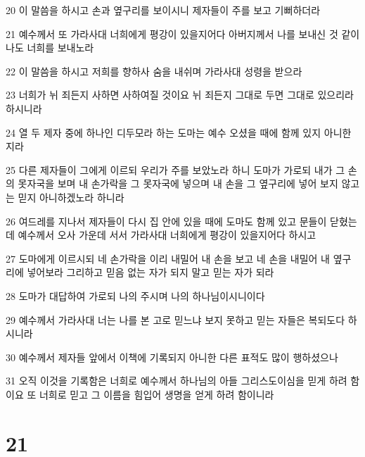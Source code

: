 \par 20 이 말씀을 하시고 손과 옆구리를 보이시니 제자들이 주를 보고 기뻐하더라
\par 21 예수께서 또 가라사대 너희에게 평강이 있을지어다 아버지께서 나를 보내신 것 같이 나도 너희를 보내노라
\par 22 이 말씀을 하시고 저희를 향하사 숨을 내쉬며 가라사대 성령을 받으라
\par 23 너희가 뉘 죄든지 사하면 사하여질 것이요 뉘 죄든지 그대로 두면 그대로 있으리라 하시니라
\par 24 열 두 제자 중에 하나인 디두모라 하는 도마는 예수 오셨을 때에 함께 있지 아니한지라
\par 25 다른 제자들이 그에게 이르되 우리가 주를 보았노라 하니 도마가 가로되 내가 그 손의 못자국을 보며 내 손가락을 그 못자국에 넣으며 내 손을 그 옆구리에 넣어 보지 않고는 믿지 아니하겠노라 하니라
\par 26 여드레를 지나서 제자들이 다시 집 안에 있을 때에 도마도 함께 있고 문들이 닫혔는데 예수께서 오사 가운데 서서 가라사대 너희에게 평강이 있을지어다 하시고
\par 27 도마에게 이르시되 네 손가락을 이리 내밀어 내 손을 보고 네 손을 내밀어 내 옆구리에 넣어보라 그리하고 믿음 없는 자가 되지 말고 믿는 자가 되라
\par 28 도마가 대답하여 가로되 나의 주시며 나의 하나님이시니이다
\par 29 예수께서 가라사대 너는 나를 본 고로 믿느냐 보지 못하고 믿는 자들은 복되도다 하시니라
\par 30 예수께서 제자들 앞에서 이책에 기록되지 아니한 다른 표적도 많이 행하셨으나
\par 31 오직 이것을 기록함은 너희로 예수께서 하나님의 아들 그리스도이심을 믿게 하려 함이요 또 너희로 믿고 그 이름을 힘입어 생명을 얻게 하려 함이니라

\chapter{21}

